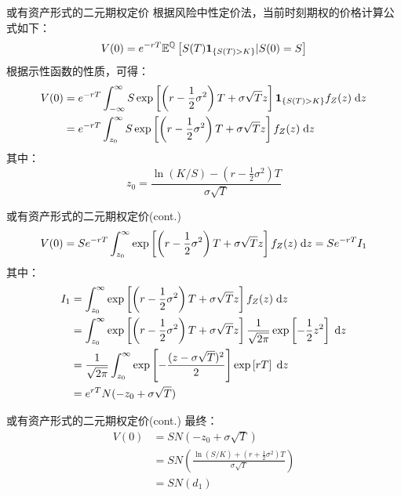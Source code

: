 \documentclass[t]{beamer}
\newcommand{\dif}{{\;\rm d}}
\newcommand{\EQ}{\mathbb{E}^{\mathbb{Q}}}
\begin{document}
\begin{frame}{或有资产形式的二元期权定价}
根据风险中性定价法，当前时刻期权的价格计算公式如下：
\[V(0)=e^{-rT}\EQ\left[S(T){\bf 1}_{\{S(T)>K\}}|S(0)=S\right] \]
根据示性函数的性质，可得：
\[\begin{split}
V(0)&=e^{-rT}\int^{\infty}_{-\infty} S\exp\left[\left(r-\frac{1}{2}\sigma^2 \right) T+\sigma \sqrt{T} z\right] {\bf 1}_{\{S(T)>K\}} f_Z(z)\dif z\\ 
&=e^{-rT}\int^{\infty}_{z_0} S\exp\left[\left(r-\frac{1}{2}\sigma^2 \right) T+\sigma \sqrt{T} z\right] f_Z(z)\dif z\\ 
\end{split} \]
其中：
\[z_0=\frac{\ln(K/S)-\left(r-\frac{1}{2}\sigma^2 \right) T}{\sigma \sqrt{T}}\]
\end{frame}

\begin{frame}{或有资产形式的二元期权定价(cont.)}
\[
V(0)=Se^{-rT}\int^{\infty}_{z_0} \exp\left[\left(r-\frac{1}{2}\sigma^2 \right) T+\sigma \sqrt{T} z\right]f_Z(z)\dif z=Se^{-rT}I_1
 \]
其中：
\[\begin{split}
I_1&=\int^{\infty}_{z_0} \exp\left[\left(r-\frac{1}{2}\sigma^2 \right) T+\sigma \sqrt{T} z\right]f_Z(z)\dif z\\
&=\int^{\infty}_{z_0} \exp\left[\left(r-\frac{1}{2}\sigma^2 \right) T+\sigma \sqrt{T} z\right]\frac{1}{\sqrt{2\pi}}\exp\left[-\frac{1}{2}z^2\right] \dif z\\
&=\frac{1}{\sqrt{2\pi}}\int^{\infty}_{z_0}\exp\left[-\frac{(z-\sigma\sqrt{T})^2}{2}\right]\exp\left[rT\right]\dif z\\
&={e^{rT}}N(-z_0+\sigma\sqrt{T})
\end{split} \]
\end{frame}

\begin{frame}{或有资产形式的二元期权定价(cont.)}
最终：
\begin{equation*}
\begin{split}
V(0)&=SN(-z_0+\sigma\sqrt{T})\\
&=SN\left(\frac{\ln(S/K)+(r+\frac{1}{2}\sigma^2)T}{\sigma\sqrt{T}} \right)\\&=SN(d_1) 
\end{split}
\end{equation*}
\end{frame}
\end{document}
